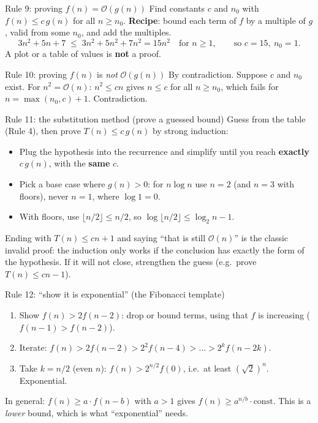 \documentclass{fkt-notes}
\newcommand{\Oh}{\mathcal{O}}
\begin{document}
\begin{rulebox}{Rule 9: proving $f(n)=\Oh(g(n))$}
Find constants $c$ and $n_0$ with $f(n)\le c\,g(n)$ for all $n\ge n_0$. \textbf{Recipe}: bound each term of $f$ by a multiple of $g$, valid from some $n_0$, and add the multiples.
\[
3n^2+5n+7\;\le\;3n^2+5n^2+7n^2=15n^2\quad\text{for }n\ge1,\qquad\text{so } c=15,\ n_0=1.
\]
A plot or a table of values is \textbf{not} a proof.
\end{rulebox}

\begin{rulebox}{Rule 10: proving $f(n)$ is \emph{not} $\Oh(g(n))$}
By contradiction. Suppose $c$ and $n_0$ exist. For $n^2=\Oh(n)$: $n^2\le cn$ gives $n\le c$ for all $n\ge n_0$, which fails for $n=\max(n_0,c)+1$. Contradiction.
\end{rulebox}

\begin{rulebox}{Rule 11: the substitution method (prove a guessed bound)}
Guess from the table (Rule 4), then prove $T(n)\le c\,g(n)$ by strong induction:
\begin{itemize}[leftmargin=1.5em,itemsep=1pt]
  \item Plug the hypothesis into the recurrence and simplify until you reach \textbf{exactly} $c\,g(n)$, with the \textbf{same} $c$.
  \item Pick a base case where $g(n)>0$: for $n\log n$ use $n=2$ (and $n=3$ with floors), never $n=1$, where $\log 1=0$.
  \item With floors, use $\lfloor n/2\rfloor\le n/2$, so $\log\lfloor n/2\rfloor\le\log_2n-1$.
\end{itemize}
\end{rulebox}

\begin{trap}
Ending with $T(n)\le cn+1$ and saying ``that is still $\Oh(n)$'' is the classic invalid proof: the induction only works if the conclusion has exactly the form of the hypothesis. If it will not close, strengthen the guess (e.g.\ prove $T(n)\le cn-1$).
\end{trap}

\begin{rulebox}{Rule 12: ``show it is exponential'' (the Fibonacci template)}
\begin{enumerate}[leftmargin=1.5em,itemsep=1pt]
  \item Show $f(n)>2f(n-2)$: drop or bound terms, using that $f$ is increasing ($f(n-1)>f(n-2)$).
  \item Iterate: $f(n)>2f(n-2)>2^2f(n-4)>\dots>2^kf(n-2k)$.
  \item Take $k=n/2$ (even $n$): $f(n)>2^{n/2}f(0)$, i.e.\ at least $(\sqrt2)^n$. Exponential.
\end{enumerate}
In general: $f(n)\ge a\cdot f(n-b)$ with $a>1$ gives $f(n)\ge a^{n/b}\cdot\text{const}$. This is a \emph{lower} bound, which is what ``exponential'' needs.
\end{rulebox}
\end{document}
